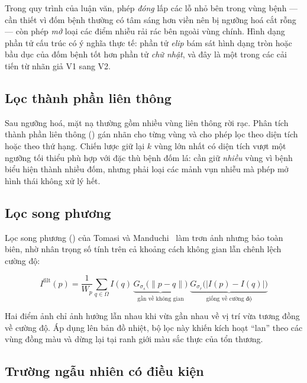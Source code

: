 Trong quy trình của luận văn, phép \emph{đóng} lấp các lỗ nhỏ bên trong vùng bệnh
--- cần thiết vì đốm bệnh thường có tâm sáng hơn viền nên bị ngưỡng hoá cắt rỗng
--- còn phép \emph{mở} loại các điểm nhiễu rải rác bên ngoài vùng chính. Hình dạng
phần tử cấu trúc có ý nghĩa thực tế: phần tử \emph{elip} bám sát hình dạng tròn
hoặc bầu dục của đốm bệnh tốt hơn phần tử \emph{chữ nhật}, và đây là một trong các
cải tiến từ nhãn giả V1 sang V2.

\subsection{Lọc thành phần liên thông}

Sau ngưỡng hoá, mặt nạ thường gồm nhiều vùng liên thông rời rạc. Phân tích thành
phần liên thông () gán nhãn cho từng vùng và cho
phép lọc theo diện tích hoặc theo thứ hạng. Chiến lược giữ lại $k$ vùng lớn nhất
có diện tích vượt một ngưỡng tối thiểu phù hợp với đặc thù bệnh đốm lá: cần giữ
\emph{nhiều} vùng vì bệnh biểu hiện thành nhiều đốm, nhưng phải loại các mảnh vụn
nhiễu mà phép mở hình thái không xử lý hết.

\subsection{Lọc song phương}

Lọc song phương () của Tomasi và
Manduchi~\cite{tomasi1998bilateral} làm trơn ảnh nhưng bảo toàn biên, nhờ nhân
trọng số tính trên cả khoảng cách không gian lẫn chênh lệch cường độ:

\begin{equation}
    I^{\text{filt}}(p) = \frac{1}{W_p}\sum_{q \in \Omega} I(q)\,
        \underbrace{G_{\sigma_s}\big(\lVert p - q \rVert\big)}_{\text{gần về không gian}}\;
        \underbrace{G_{\sigma_r}\big(|I(p) - I(q)|\big)}_{\text{giống về cường độ}}
    \label{eq:bilateral}
\end{equation}

Hai điểm ảnh chỉ ảnh hưởng lẫn nhau khi vừa gần nhau về vị trí vừa tương đồng về
cường độ. Áp dụng lên bản đồ nhiệt, bộ lọc này khiến kích hoạt ``lan'' theo các
vùng đồng màu và dừng lại tại ranh giới màu sắc thực của tổn thương.

\subsection{Trường ngẫu nhiên có điều kiện}

